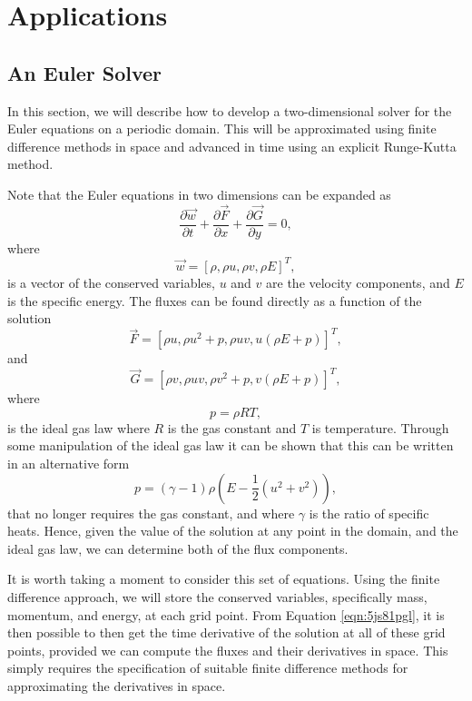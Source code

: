 \chapter{Applications}
\section{An Euler Solver}
In this section, we will describe how to develop a two-dimensional solver for the Euler equations on a periodic domain. This will be approximated using finite difference methods in space and advanced in time using an explicit Runge-Kutta method. 

Note that the Euler equations in two dimensions can be expanded as
\begin{equation}
	\label{eqn:5js81pgl}
	\frac{\partial \vec{w}}{\partial t} + \frac{\partial{\vec{F}}}{\partial x} + \frac{\partial{\vec{G}}}{\partial y} = 0,
\end{equation}
where
\begin{equation}
	\label{eqn:dh691kgu}
	\vec{w} = [\rho,\rho u, \rho v, \rho E]^T,
\end{equation}
is a vector of the conserved variables, $u$ and $v$ are the velocity components, and $E$ is the specific energy. The fluxes can be found directly as a function of the solution
\begin{equation}
	\label{eqn:sm5j29dj}
	\vec{F} = [\rho u,\rho u^2 + p, \rho uv, u(\rho E+p)]^T,
\end{equation}
and
\begin{equation}
	\label{eqn:029as5ns}
	\vec{G} = [\rho v,\rho u v, \rho v^2+p, v(\rho E+p)]^T,
\end{equation}
where
\begin{equation} 
	p = \rho R T,
\end{equation}
is the ideal gas law where $R$ is the gas constant and $T$ is temperature. Through some manipulation of the ideal gas law it can be shown that this can be written in an alternative form
\begin{equation} 
	p = (\gamma -1) \rho \left(E - \frac{1}{2}\left(u^2 + v^2 \right) \right),
\end{equation}
that no longer requires the gas constant, and where $\gamma$ is the ratio of specific heats. Hence, given the value of the solution at any point in the domain, and the ideal gas law, we can determine both of the flux components.

It is worth taking a moment to consider this set of equations. Using the finite difference approach, we will store the conserved variables, specifically mass, momentum, and energy, at each grid point. From Equation \ref{eqn:5js81pgl}, it is then possible to then get the time derivative of the solution at all of these grid points, provided we can compute the fluxes and their derivatives in space. This simply requires the specification of suitable finite difference methods for approximating the derivatives in space.


